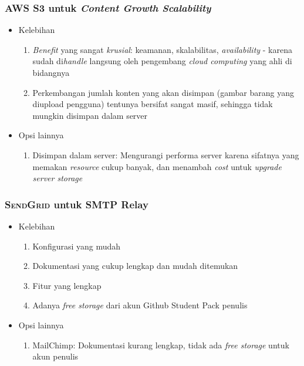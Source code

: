 	\subsubsection{\textsc{AWS S3} untuk \textit{Content Growth Scalability}}
	\begin{itemize}
		\item Kelebihan
		\begin{enumerate}
			\item \textit{Benefit} yang sangat \textit{krusial}:  keamanan, skalabilitas, \textit{availability} - karena sudah di\textit{handle} langsung oleh pengembang \textit{cloud computing} yang ahli di bidangnya
			\item Perkembangan jumlah konten yang akan disimpan (gambar barang yang diupload pengguna)  tentunya bersifat sangat masif, sehingga tidak mungkin disimpan dalam server
		\end{enumerate}
		\item Opsi lainnya
		\begin{enumerate}
			\item Disimpan dalam server: Mengurangi performa server karena sifatnya yang memakan \textit{resource} cukup banyak, dan menambah \textit{cost} untuk \textit{upgrade server storage}
		\end{enumerate}
	\end{itemize}
	
	\subsubsection{\textsc{SendGrid} untuk SMTP Relay}
	\begin{itemize}
		\item Kelebihan
		\begin{enumerate}
			\item Konfigurasi yang mudah
			\item Dokumentasi yang cukup lengkap dan mudah ditemukan
			\item Fitur yang lengkap
			\item Adanya \textit{free storage} dari akun Github Student Pack penulis
		\end{enumerate}
		\item Opsi lainnya
		\begin{enumerate}
			\item MailChimp:  Dokumentasi kurang lengkap, tidak ada \textit{free storage} untuk akun penulis
		\end{enumerate}
	\end{itemize}
	
